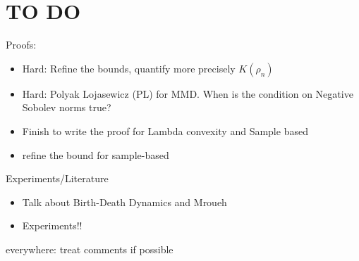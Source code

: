
\section*{TO DO}

Proofs:
\begin{itemize}
	\item Hard: Refine the bounds, quantify more precisely $K(\rho_n)$
	\item Hard: Polyak Lojasewicz (PL) for MMD. When is the condition on Negative Sobolev norms true?
	\item Finish to write the proof for Lambda convexity and Sample based
	\item refine the bound for sample-based
\end{itemize}


Experiments/Literature
\begin{itemize}
	\item Talk about Birth-Death Dynamics and Mroueh
	\item Experiments!!
\end{itemize}
everywhere: treat comments if possible


